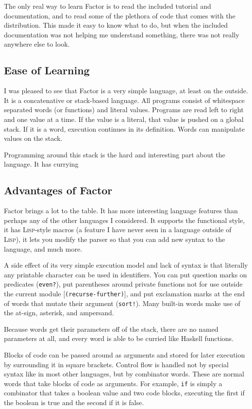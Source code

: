 \documentclass{article}
\begin{document}
The only real way to learn Factor is to read the included tutorial and
documentation, and to read some of the plethora of code that comes with the
distribution.  This made it easy to know what to do, but when the included
documentation was not helping me understand something, there was not really
anywhere else to look.

\subsection{Ease of Learning}

I was pleased to see that Factor is a very simple language, at least on the
outside.  It is a concatenative or stack-based language.  All programs consist
of whitespace separated words (or functions) and literal values.  Programs are
read left to right and one value at a time.  If the value is a literal, that
value is pushed on a global stack.  If it is a word, execution continues in its
definition.  Words can manipulate values on the stack.

Programming around this stack is the hard and interesting part about the
language.  It has currying 

\subsection{Advantages of Factor}

Factor brings a lot to the table.  It has more interesting language features
than perhaps any of the other languages I considered.  It supports the
functional style, it has \textsc{Lisp}-style macros (a feature I have never seen
in a language outside of \textsc{Lisp}), it lets you modify the parser so that
you can add new syntax to the language, and much more.

A side effect of its very simple execution model and lack of syntax is that
literally any printable character can be used in identifiers.  You can put
question marks on predicates (\texttt{even?}), put parentheses around private functions
not for use outside the current module [\texttt{(recurse-further)}], and put
exclamation marks at the end of words that mutate their argument
(\texttt{sort!}).  Many built-in words make use of the at-sign, asterisk, and
ampersand.

Because words get their parameters off of the stack, there are no named
parameters at all, and every word is able to be curried like Haskell
functions.

Blocks of code can be passed around as arguments and stored for later execution
by surrounding it in square brackets.  Control flow is handled not by special
syntax like in most other languages, but by combinator words.  These are normal
words that take blocks of code as arguments.  For example, \texttt{if} is simply
a combinator that takes a boolean value and two code blocks, executing the first
if the boolean is true and the second if it is false.
\end{document}
